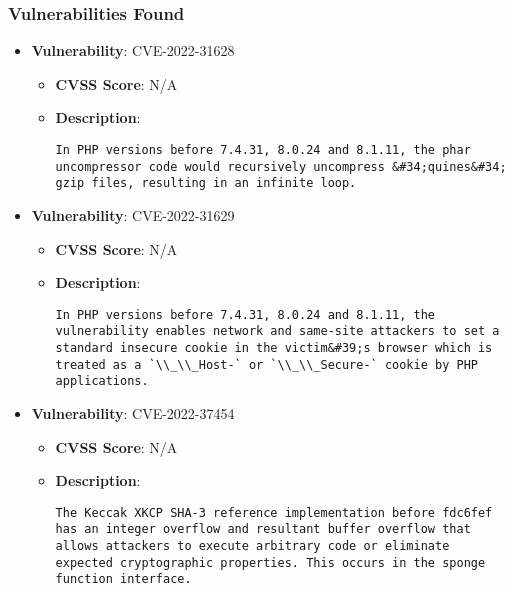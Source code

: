 \documentclass{article}
\begin{document}
\subsubsection*{Vulnerabilities Found}

\begin{itemize}
    
        \item \textbf{Vulnerability}: CVE-2022-31628
        \begin{itemize}
            \item \textbf{CVSS Score}:  N/A 
            \item \textbf{Description}:
            \parbox[t]{0.9\linewidth}{
                \verb|In PHP versions before 7.4.31, 8.0.24 and 8.1.11, the phar uncompressor code would recursively uncompress &#34;quines&#34; gzip files, resulting in an infinite loop.|
            }
        \end{itemize}
    
        \item \textbf{Vulnerability}: CVE-2022-31629
        \begin{itemize}
            \item \textbf{CVSS Score}:  N/A 
            \item \textbf{Description}:
            \parbox[t]{0.9\linewidth}{
                \verb|In PHP versions before 7.4.31, 8.0.24 and 8.1.11, the vulnerability enables network and same-site attackers to set a standard insecure cookie in the victim&#39;s browser which is treated as a `\\_\\_Host-` or `\\_\\_Secure-` cookie by PHP applications.|
            }
        \end{itemize}
    
        \item \textbf{Vulnerability}: CVE-2022-37454
        \begin{itemize}
            \item \textbf{CVSS Score}:  N/A 
            \item \textbf{Description}:
            \parbox[t]{0.9\linewidth}{
                \verb|The Keccak XKCP SHA-3 reference implementation before fdc6fef has an integer overflow and resultant buffer overflow that allows attackers to execute arbitrary code or eliminate expected cryptographic properties. This occurs in the sponge function interface.|
            }
        \end{itemize}
    

\end{itemize}
\end{document}
